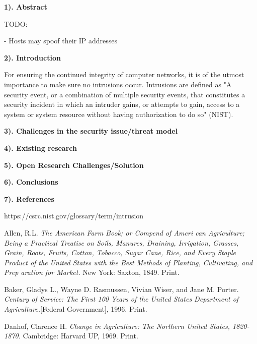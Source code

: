 \documentclass[12pt]{article}
\newcommand{\bibent}{\noindent \hangindent 40pt}
\newenvironment{workscited}{\newpage \textbf{7). References}}{\newpage }
\begin{document}
\begin{flushleft}


\textbf{1). Abstract}

TODO:

- Hosts may spoof their IP addresses

\textbf{2). Introduction}

For ensuring the continued integrity of computer networks, it is of the utmost importance to make sure no intrusions occur. Intrusions are defined as "A security event, or a combination of multiple security events, that constitutes a security incident in which an intruder gains, or attempts to gain, access to a system or system resource without having authorization to do so" (NIST). 

\textbf{3). Challenges in the security issue/threat model}

\textbf{4). Existing research}

\textbf{5). Open Research Challenges/Solution}

\textbf{6). Conclusions}

\newpage

\begin{workscited}

https://csrc.nist.gov/glossary/term/intrusion

\bibent
Allen, R.L. \textit{The American Farm Book; or Compend of Ameri can Agriculture; Being a Practical Treatise on Soils, Manures, Draining, Irrigation, Grasses, Grain, Roots, Fruits, Cotton, Tobacco, Sugar Cane, Rice, and Every Staple Product of the United States with the Best Methods of Planting, Cultivating, and Prep aration for Market.} New York: Saxton, 1849. Print.

\bibent
Baker, Gladys L., Wayne D. Rasmussen, Vivian Wiser, and Jane M. Porter. \textit{Century of Service: The First 100 Years of the United States Department of Agriculture.}[Federal Government], 1996. Print.

\bibent
Danhof, Clarence H. \textit{Change in Agriculture: The Northern United States, 1820-1870.} Cambridge: Harvard UP, 1969. Print.


\end{workscited}

\end{flushleft}
\end{document}
